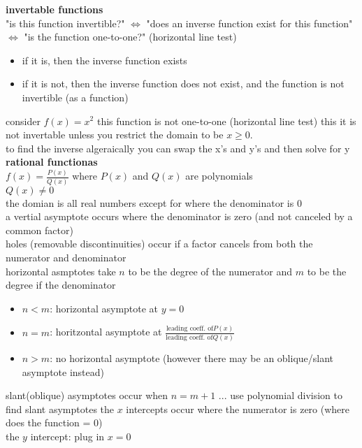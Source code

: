 \documentclass{article}
\begin{document}
\textbf{invertable functions}\\
	"is this function invertible?" $\Leftrightarrow$ "does an inverse function exist for this function" $\Leftrightarrow$ "is the function one-to-one?" (horizontal line test)
	\begin{itemize}
		\item if it is, then the inverse function exists
		\item if it is not, then the inverse function does not exist, and the function is not invertible (as a function)
	\end{itemize}
	consider $f(x) = x^2$ this function is not one-to-one (horizontal line test) this it is not invertable unless you restrict the domain to be $x \geq 0$.\\
	to find the inverse algeraically you can swap the x's and y's and then solve for y\\

\textbf{rational functionas}\\
$f(x) = \frac{P(x)}{Q(x)}$ where $P(x)$ and $Q(x)$ are polynomials\\
$Q(x) \ne 0$\\
the domian is all real numbers except for where the denominator is 0\\
a vertial asymptote occurs where the denominator is zero (and not canceled by a common factor)\\
holes (removable discontinuities) occur if a factor cancels from both the numerator and denominator\\
horizontal asmptotes take $n$ to be the degree of the numerator and $m$ to be the degree if the denominator
	\begin{itemize}
		\item $n < m$: horizontal asymptote at $y = 0$
		\item $n = m$: horitzontal asymptote at $\frac{\text{leading coeff. of}P(x)}{\text{leading coeff. of}Q(x)}$
		\item $n > m$: no horizontal asymptote (however there may be an oblique/slant asymptote instead)
	\end{itemize}
slant(oblique) asymptotes occur when $n = m+1$ ... use polynomial division to find slant asymptotes
the $x$ intercepts occur where the numerator is zero (where does the function = 0)\\
the $y$ intercept: plug in $x = 0$
\end{document}
